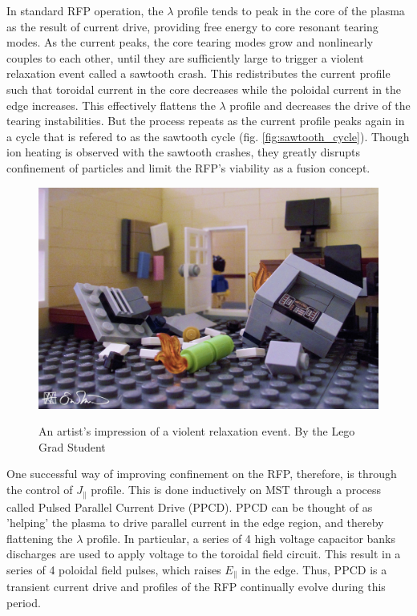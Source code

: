 \begin{refsection}
In standard RFP operation, the $\lambda$ profile tends to peak in the core of the plasma as the result of current drive, providing free energy to core resonant tearing modes. As the current peaks, the core tearing modes grow and nonlinearly couples to each other, until they are sufficiently large to trigger a violent relaxation event called a sawtooth crash. This redistributes the current profile such that toroidal current in the core decreases while the poloidal current in the edge increases\cite{Terry2004MeasurementTorus}. This effectively flattens the $\lambda$ profile and decreases the drive of the tearing instabilities. But the process repeats as the current profile peaks again in a cycle that is refered to as the sawtooth cycle (fig. \ref{fig:sawtooth_cycle}). Though ion heating is
observed with the sawtooth crashes\cite{Bodin1980Reversed-field-pinchReserarch}, they greatly disrupts
confinement of particles and limit the RFP's viability as a fusion concept.

\begin{figure}[!htb]
	\centering
	\includegraphics[width = .8\linewidth]{./1_Introduction/violent_relaxation.jpg}
	\label{fig:violet_relaxation}
	\caption[An illustration of violent relaxation]{An artist's impression of a violent relaxation event. By the Lego Grad Student}
\end{figure}%

One successful way of improving confinement on the RFP, therefore, is through the control of $J_{\parallel}$ profile. This is done inductively on MST through a process called Pulsed Parallel Current Drive (PPCD). PPCD can be thought of as 'helping' the plasma to drive parallel current in the edge region, and thereby flattening the $\lambda$ profile\cite{Sarff1995TransportPinch}. In particular, a series of 4 high voltage capacitor banks discharges are used to apply voltage to the toroidal field circuit. This result in a series of 4 poloidal field pulses, which raises $E_{\parallel}$ in the edge. Thus, PPCD is a transient current drive and profiles of the RFP continually evolve during this period. 


\end{refsection}
